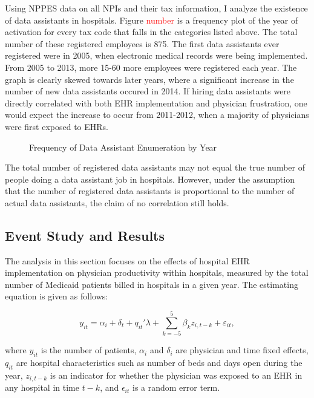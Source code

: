 \documentclass[11pt]{article}
\begin{document}
Using NPPES data on all NPIs and their tax information, I analyze the existence of data assistants in hospitals. Figure \textcolor{red}{number} is a frequency plot of the year of activation for every tax code that falls in the categories listed above. The total number of these registered employees is 875. The first data assistants ever registered were in 2005, when electronic medical records were being implemented. From 2005 to 2013, more 15-60 more employees were registered each year. The graph is clearly skewed towards later years, where a significant increase in the number of new data assistants occured in 2014. If hiring data assistants were directly correlated with both EHR implementation and physician frustration, one would expect the increase to occur from 2011-2012, when a majority of physicians were first exposed to EHRs. 


\vspace{5mm}
\begin{figure}[ht]
\caption{Frequency of Data Assistant Enumeration by Year}

    \label{fig:dataassistant_histogram}
\end{figure}

The total number of registered data assistants may not equal the true number of people doing a data assistant job in hospitals. However, under the assumption that the number of registered data assistants is proportional to the number of actual data assistants, the claim of no correlation still holds. 


\subsection{Event Study and Results}

The analysis in this section focuses on the effects of hospital EHR implementation on physician productivity within hospitals, measured by the total number of Medicaid patients billed in hospitals in a given year. The estimating equation is given as follows: 

\begin{equation*}
    y_{it}=\alpha_i+\delta_t+q_{it}'\lambda+\sum_{k=-5}^5 \beta_kz_{i,t-k} + \varepsilon_{it},
\end{equation*}

where $y_{it}$ is the number of patients, $\alpha_i$ and $\delta_i$ are physician and time fixed effects, $q_{it}$ are hospital characteristics such as number of beds and days open during the year, $z_{i,t-k}$ is an indicator for whether the physician was exposed to an EHR in any hospital in time $t-k$, and $\epsilon_{it}$ is a random error term. 
\end{document}
